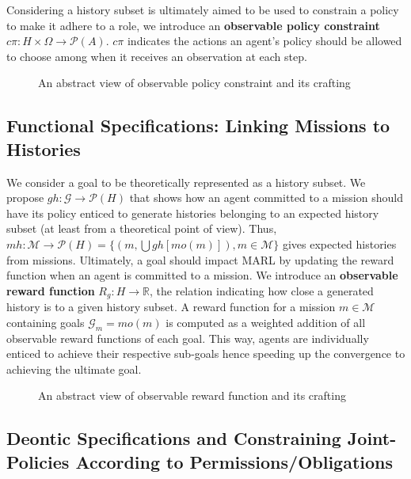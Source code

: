 \documentclass[sn-mathphys-num]{sn-jnl}%
\theoremstyle{thmstyleone}%
\theoremstyle{thmstyletwo}%
\theoremstyle{thmstylethree}%
\begin{document}
Considering a history subset is ultimately aimed to be used to constrain a policy to make it adhere to a role, we introduce an \textbf{observable policy constraint} $c\pi: H \times \Omega \rightarrow \mathcal{P}(A)$. $c\pi$ indicates the actions an agent's policy should be allowed to choose among when it receives an observation at each step.

\begin{figure}[h!]
    \centering
    
    \caption{An abstract view of observable policy constraint and its crafting}
    \label{fig:PRAHOM_opc}
\end{figure}


\subsection{Functional Specifications: Linking Missions to Histories}

We consider a goal to be theoretically represented as a history subset. We propose $gh: \mathcal{G} \rightarrow \mathcal{P}(H)$ that shows how an agent committed to a mission should have its policy enticed to generate histories belonging to an expected history subset (at least from a theoretical point of view). Thus, $mh: \mathcal{M} \rightarrow \mathcal{P}(H) = \{(m,\bigcup gh[mo(m)]), m \in \mathcal{M}\}$ gives expected histories from missions. Ultimately, a goal should impact MARL by updating the reward function when an agent is committed to a mission. We introduce an \textbf{observable reward function} $R_{g}: H \rightarrow \mathbb{R}$, the relation indicating how close a generated history is to a given history subset. A reward function for a mission $m \in \mathcal{M}$ containing goals $\mathcal{G}_{m} = mo(m)$ is computed as a weighted addition of all observable reward functions of each goal. This way, agents are individually enticed to achieve their respective sub-goals hence speeding up the convergence to achieving the ultimate goal.

\begin{figure}[h!]
    \centering
    
    \caption{An abstract view of observable reward function and its crafting}
    \label{fig:goal_mission_scheme}
\end{figure}

\subsection{Deontic Specifications and Constraining Joint-Policies According to Permissions/Obligations}
\end{document}
